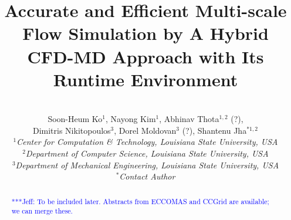 \documentclass[conference,final]{IEEEtran}
\title{Accurate and Efficient Multi-scale Flow Simulation by A Hybrid CFD-MD Approach with Its Runtime Environment}
\author{
 ~\\[-2em]
 Soon-Heum Ko$^{1}$, Nayong Kim$^{1}$, Abhinav Thota$^{1,2}$ (?), \\
 Dimitris Nikitopoulos$^{3}$, Dorel Moldovan$^{3}$ (?), Shantenu Jha$^{*1,2}$\\
 \small{\emph{$^{1}$Center for Computation \& Technology, Louisiana State University, USA}}\\
 \small{\emph{$^{2}$Department of Computer Science, Louisiana State University, USA}}\\
 \small{\emph{$^{3}$Department of Mechanical Engineering, Louisiana State University, USA}}\\
 \small{\emph{$^{*}$Contact Author}}\\
}
\newcommand{\skonote}[1]{ {\textcolor{blue} { ***Jeff: #1 }}}
\newcommand{\skonote}[1]{}
\begin{document}
\maketitle

\begin{abstract}
\skonote{To be included later. Abstracts from ECCOMAS and CCGrid are available; we can merge these.}

\end{abstract}
\end{document}
